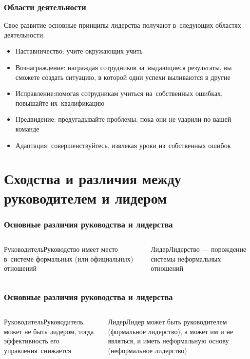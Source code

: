 \documentclass{../industrial-development}
\begin{document}
\begin{frame} \frametitle {Области деятельности}

Свое развитие основные принципы лидерства получают в~следующих областях деятельности:

\begin{itemize}
	\item Наставничество: учите окружающих учить
	\item Вознаграждение: награждая сотрудников за~выдающиеся результаты, вы сможете создать ситуацию, в которой одни успехи выливаются в другие
	\item Исправление:помогая сотрудникам учиться на~собственных ошибках, повышайте их~квалификацию
	\item Предвидение: предугадывайте проблемы, пока они не ударили по вашей команде
	\item Адаптация: совершенствуйтесь, извлекая уроки из~собственных ошибок
\end{itemize}
\end{frame}





\section{Сходства и различия между руководителем и лидером}

\begin{frame} \frametitle{Основные различия руководства и лидерства}

\begin{columns}
 			\begin{block}{Руководитель}Руководство имеет место в~системе формальных (или официальных) отношений\end{block}
 			\begin{block}{Лидер}Лидерство --- порождение системы неформальных отношений\end{block}
 	\end{columns}


\end{frame}



\begin{frame} \frametitle{Основные различия руководства и лидерства}

\begin{columns}
 		\column{4.8cm}
 			\begin{block}{Руководитель}Руководитель может не быть лидером, тогда эффективность его управления~снижается\hspace{28pt} \end{block}
 			\begin{block}{Лидер}Лидер может быть руководителем (формальное лидерство), а может им и не являться, и иметь неформальную основу (неформальное лидерство)\end{block}
 	\end{columns}

\end{frame}
\end{document}
